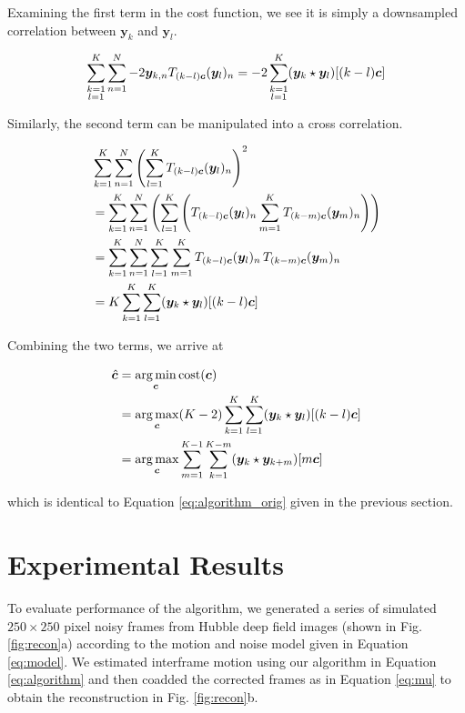 \documentclass{article}
\newcommand\lstar{\mkern4mu{\star}\mkern4mu}
\DeclareMathOperator*{\argmin}{\arg\min}
\DeclareMathOperator*{\argmax}{\arg\max}
\begin{document}
Examining the first term in the cost function, we see it is simply a downsampled correlation between $\bm{y}_k$ and $\bm{y}_l$.

$$\sum_{\substack{k=1 \\ l=1}}^K \sum_{n=1}^N -2\bm{y}_{k,n} T_{(k-l)\bm{c}}(\bm{y}_l)_n = -2\sum_{\substack{k=1 \\ l=1}}^K (\bm{y}_k \lstar \bm{y}_l) [(k-l)\bm{c}]$$

Similarly, the second term can be manipulated into a cross correlation.

\begin{align*}
  &\sum_{k=1}^K \sum_{n=1}^N \left(\sum_{l=1}^K T_{(k-l)\bm{c}}(\bm{y}_l)_n\right)^2 \\
  &= \sum_{k=1}^K \sum_{n=1}^N \left(\sum_{l=1}^K \left( T_{(k-l)\bm{c}}(\bm{y}_l)_n \sum_{m=1}^K T_{(k-m)\bm{c}}(\bm{y}_m)_n \right)\right) \\
  &= \sum_{k=1}^K \sum_{n=1}^N \sum_{l=1}^K \sum_{m=1}^K T_{(k-l)\bm{c}}(\bm{y}_l)_n\, T_{(k-m)\bm{c}}(\bm{y}_m)_n \\
  &= K \sum_{k=1}^K \sum_{l=1}^K (\bm{y}_k \lstar \bm{y}_l)[(k-l)\bm{c}]
\end{align*}

Combining the two terms, we arrive at

\begin{align*}
  \hat{\bm{c}} &= \argmin_{\bm{c}} \text{cost}(\bm{c}) \\
  &= \argmax_{\bm{c}} (K - 2) \sum_{k=1}^K \sum_{l=1}^K (\bm{y}_k \lstar \bm{y}_l)[(k - l)\bm{c}] \\
  &= \argmax_{\bm{c}} \sum_{m=1}^{K-1} \sum_{k=1}^{K-m} (\bm{y}_k \lstar \bm{y}_{k+m})[m\bm{c}]
\end{align*}

which is identical to Equation \ref{eq:algorithm_orig} given in the previous section.

\section{Experimental Results}
\label{sec:results}

To evaluate performance of the algorithm, we generated a series of simulated $250\times250$ pixel noisy frames from Hubble deep field images (shown in Fig. \ref{fig:recon}a) according to the motion and noise model given in Equation \ref{eq:model}.  We estimated interframe motion using our algorithm in Equation \ref{eq:algorithm} and then coadded the corrected frames as in Equation \ref{eq:mu} to obtain the reconstruction in Fig. \ref{fig:recon}b.
\end{document}
